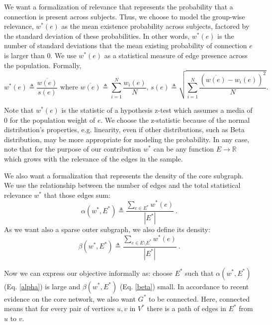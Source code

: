 We want a formalization of relevance that represents the probability that a connection is present across subjects. Thus, we choose to model the group-wise relevance, $w^*(e)$ as the mean existence probability across subjects, factored by the standard deviation of these probabilities. In other words, $w^*(e)$ is the number of standard deviations that the mean existing probability of connection $e$ is larger than $0$. We use $w^*(e)$ as a statistical measure of edge presence across the population. Formally, \begin{equation}\label{weight}
w^*(e) \triangleq \frac{\overline{w(e)}}{s(e)}\text{ where } \overline{w(e)}\triangleq\sum_{i=1}^N\frac{w_i(e)} N,\, {s(e)}\triangleq  \sqrt{\sum_{i=1}^N \frac{\left(\overline{w(e)}-w_i(e)\right)^2}N}.
\end{equation}

Note that $w^*(e)$ is the statistic of a hypothesis z-test which assumes a media of 0 for the population weight of $e$. We choose the z-statistic because of the normal distribution's properties, e.g. linearity, even if other distributions, such as Beta distribution, may be more appropriate for modeling the probability. In any case, note that for the purpose of our contribution $w^*$ can be any function $E \rightarrow \mathbb{R}$ which grows with the relevance of the edges in the sample.

We also want a formalization that represents the density of the core subgraph. We use the relationship between the number of edges and the total statistical relevance $w^*$ that those edges sum:
\begin{equation}\label{alpha}
\alpha(w^*, E^*) \triangleq \frac{\sum_{e \in E^*} w^*(e)}{|E^*|} ~.
\end{equation}
As we want also a sparse outer subgraph, we also define its density:
\begin{equation}\label{beta}
\beta(w^*, E^*) \triangleq \frac{\sum_{e \in E \setminus E^*} w^*(e)}{|E^*|} ~.
\end{equation}

Now we can express our objective informally as: choose $E^*$ such that $\alpha(w^*, E^*)$ (Eq. \ref{alpha}) is large and $\beta(w^*, E^*)$ (Eq. \ref{beta}) small. In accordance to recent evidence on the core network, we also want $G^*$ to be connected. Here, connected means that for every pair of vertices $u, v$ in $V^*$ there is a path of edges in $E^*$ from $u$ to $v$.

